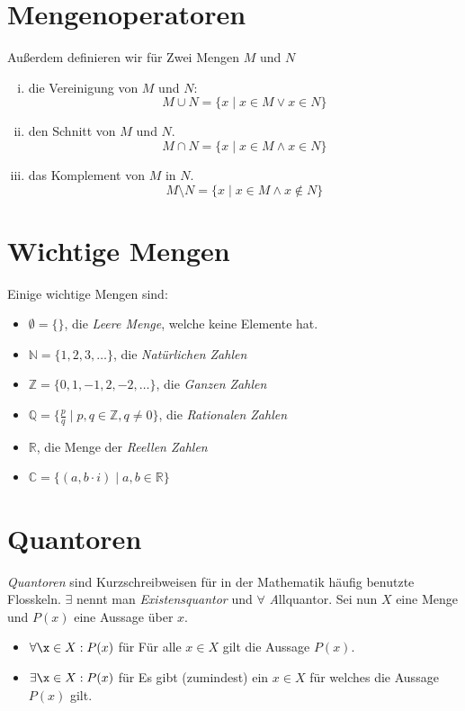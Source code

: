 \documentclass{scrreprt}
\newcommand{\NN}{\mathbb{N}}
\newcommand{\ZZ}{\mathbb{Z}}
\newcommand{\QQ}{\mathbb{Q}}
\newcommand{\RR}{\mathbb{R}}
\newcommand{\CC}{\mathbb{C}}
\begin{document}
	\section{Mengenoperatoren}
	Außerdem definieren wir für Zwei Mengen $M$ und $N$
	\begin{enumerate}[i)]
		\item
			die Vereinigung von $M$ und $N$:\\
			\[
				M \cup N = \lbrace x \mid x \in M \lor x \in N \rbrace
			\]
		\item
			den Schnitt von $M$ und $N$.
			\[
				M \cap N = \lbrace x \mid x \in M \land x \in N \rbrace
			\]
		\item
			das Komplement von $M$ in $N$.
			\[
				M \setminus N = \lbrace x \mid x \in M \land x \notin N \rbrace
			\]
	\end{enumerate}

	\section{Wichtige Mengen}
		Einige wichtige Mengen sind:
		\begin{itemize}
			\item
				$\emptyset = \lbrace \rbrace$, die \emph{Leere Menge}, welche keine Elemente hat.
			\item
				$\NN = \lbrace 1, 2, 3, \dots \rbrace$, die \emph{Natürlichen Zahlen}
			\item
				$\ZZ = \lbrace 0, 1, -1, 2, -2, \dots \rbrace$, die \emph{Ganzen Zahlen}
			\item
				$\QQ = \lbrace \frac{p}{q} \mid p,q \in \ZZ, q \neq 0\rbrace$, die \emph{Rationalen Zahlen}
			\item
				$\RR$, die Menge der \emph{Reellen Zahlen}
			\item
				$\CC = \lbrace (a, b \cdot i) \mid a, b \in \RR \rbrace$
 		\end{itemize}

	\section{Quantoren}
	\emph{Quantoren} sind Kurzschreibweisen für in der Mathematik häufig benutzte Flosskeln. $\exists$ nennt man \emph{Existensquantor} und $\forall$ \emph Allquantor. Sei nun $X$ eine Menge und $P(x)$ eine Aussage über $x$.
	\begin{itemize}
		\item
			$\forall \x \in X : P(x)$ für \glqq Für alle $x \in X$ gilt die Aussage $P(x)$.\grqq
		\item
			$\exists \x \in X : P(x)$ für \glqq Es gibt (zumindest) ein $x \in X$ für welches die Aussage $P(x)$ gilt.\grqq
	\end{itemize}
\end{document}

